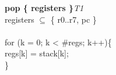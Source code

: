 


\begin{instructionblock}{\imagewidth}%
    \textbf{pop \{ registers \}}\hfill\textit{T1}\\
    registers $\subseteq$ \{ r0..r7, pc \}\\
    {}\\
    for (k = 0; k < \#regs; k++)\{\\
    regs[k] = stack[k];\\
    \}
\end{instructionblock}

